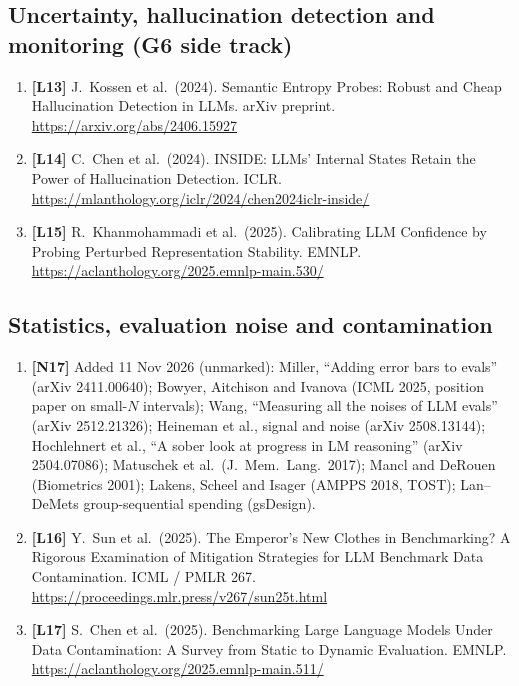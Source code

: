 \documentclass[10pt,a4paper]{article}
\begin{document}
{\subsection*{Uncertainty, hallucination detection and monitoring (G6 side track)}
\begin{enumerate}[label={},leftmargin=0pt]
\item \textbf{[L13]} J.~Kossen et al.\ (2024). Semantic Entropy Probes: Robust and Cheap Hallucination Detection
in LLMs. arXiv preprint. \url{https://arxiv.org/abs/2406.15927}
\item \textbf{[L14]} C.~Chen et al.\ (2024). INSIDE: LLMs' Internal States Retain the Power of Hallucination
Detection. ICLR. \url{https://mlanthology.org/iclr/2024/chen2024iclr-inside/}
\item \textbf{[L15]} R.~Khanmohammadi et al.\ (2025). Calibrating LLM Confidence by Probing Perturbed
Representation Stability. EMNLP. \url{https://aclanthology.org/2025.emnlp-main.530/}
\end{enumerate}

\subsection*{Statistics, evaluation noise and contamination}
\begin{enumerate}[label={},leftmargin=0pt]
\item \textbf{[N17]} Added 11 Nov 2026 (unmarked): Miller, ``Adding error bars to evals'' (arXiv 2411.00640);
Bowyer, Aitchison and Ivanova (ICML 2025, position paper on small-$N$ intervals); Wang, ``Measuring all the noises
of LLM evals'' (arXiv 2512.21326); Heineman et al., signal and noise (arXiv 2508.13144); Hochlehnert et al., ``A
sober look at progress in LM reasoning'' (arXiv 2504.07086); Matuschek et al.\ (J.\ Mem.\ Lang.\ 2017); Mancl and
DeRouen (Biometrics 2001); Lakens, Scheel and Isager (AMPPS 2018, TOST); Lan--DeMets group-sequential spending
(gsDesign).
\item \textbf{[L16]} Y.~Sun et al.\ (2025). The Emperor's New Clothes in Benchmarking? A Rigorous Examination of
Mitigation Strategies for LLM Benchmark Data Contamination. ICML / PMLR 267.
\url{https://proceedings.mlr.press/v267/sun25t.html}
\item \textbf{[L17]} S.~Chen et al.\ (2025). Benchmarking Large Language Models Under Data Contamination: A Survey
from Static to Dynamic Evaluation. EMNLP. \url{https://aclanthology.org/2025.emnlp-main.511/}
\end{enumerate}

}
\end{document}
